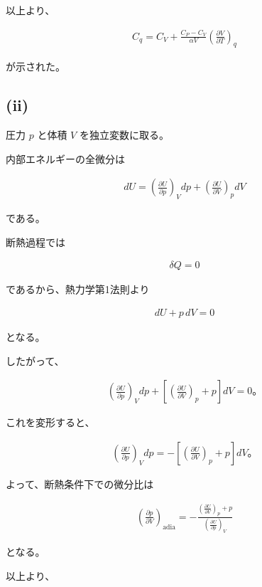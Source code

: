 \documentclass[platex,dvipdfmx,a4paper]{jsarticle}
\begin{document}
以上より、

\begin{align*}
C_q
=
C_V
+
\frac{C_P-C_V}
{\alpha V}
\left(\frac{\partial V}{\partial T}\right)_q
\end{align*}

が示された。

\subsection{(ii)}

圧力 $p$ と体積 $V$ を独立変数に取る。

内部エネルギーの全微分は

\begin{align*}
dU
=
\left(\frac{\partial U}{\partial p}\right)_V dp
+
\left(\frac{\partial U}{\partial V}\right)_p dV
\end{align*}

である。

断熱過程では

\begin{align*}
\delta Q=0
\end{align*}

であるから、熱力学第1法則より

\begin{align*}
dU+p\,dV=0
\end{align*}

となる。

したがって、

\begin{align*}
\left(\frac{\partial U}{\partial p}\right)_V dp
+
\left[
\left(\frac{\partial U}{\partial V}\right)_p+p
\right]dV
=
0。
\end{align*}

これを変形すると、

\begin{align*}
\left(\frac{\partial U}{\partial p}\right)_V dp
=
-
\left[
\left(\frac{\partial U}{\partial V}\right)_p+p
\right]dV。
\end{align*}

よって、断熱条件下での微分比は

\begin{align*}
\left(\frac{\partial p}{\partial V}\right)_{\mathrm{adia}}
=
-
\frac{
\left(\frac{\partial U}{\partial V}\right)_p+p
}{
\left(\frac{\partial U}{\partial p}\right)_V
}
\end{align*}

となる。

以上より、
\end{document}
